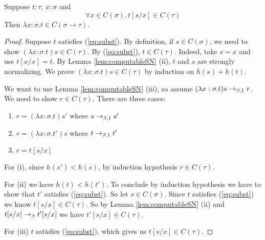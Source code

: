 \begin{boxlem}\label{lem:lambdaconstruct}
    Suppose $t : \tau$, $x : \sigma$ and
    \begin{equation}\label{eq:subst}
        \forall x \in C(\sigma), t[s/x] \in C(\tau) \tag{$*$}
    \end{equation}
    Then $\lambda x : \sigma. t \in C(\sigma \to \tau)$.
\end{boxlem}
\begin{proof}
    Suppose $t$ satisfies (\ref{eq:subst}). 
    By definition, if $s \in C(\sigma)$, we need to show $(\lambda x:\sigma.t)s \in C(\tau)$.
    By (\ref{eq:subst}), $t \in C(\tau)$. 
    Indeed, take $s = x$ and use $t[x/x] = t$. 
    By Lemma \ref{lem:computableSN} (ii), $t$ and $s$ are strongly normalizing. 
    We prove $(\lambda x : \sigma. t)s \in C(\tau)$ by induction on $h(s) + h(t)$. 

    We want to use Lemma \ref{lem:computableSN} (iii), so assume $(\lambda x: \sigma.t)s \to_{\beta, 1} r$. 
    We need to show $r \in C(\tau)$. 
    There are three cases: 
    \begin{enumerate}
        \item $r = (\lambda x : \sigma . t) s'$ where $s \to_{\beta, 1} s'$
        \item $r = (\lambda x : \sigma. t') s$ where $t \to_{\beta, 1} t'$
        \item $r = t[s/x]$
    \end{enumerate}
    For (i), since $h(s') < h(s)$, by induction hypothesis $r \in C(\tau)$. 

    For (ii) we have $h(t) < h(t')$. 
    To conclude by induction hypothesis we have to show that $t'$ satisfies (\ref{eq:subst}). 
    So let $s \in C(\sigma)$. 
    Since $t$ satisfies (\ref{eq:subst}) we know $t[s/x] \in C(\tau)$. 
    So by Lemma \ref{lem:computableSN} (ii) and $t[s/x] \to_{\beta} t'[s/x]$ we have $t'[s/x] \in C(\tau)$. 

    For (iii) $t$ satisfies (\ref{eq:subst}), which gives us $t[s/x] \in C(\tau)$. 
\end{proof}

